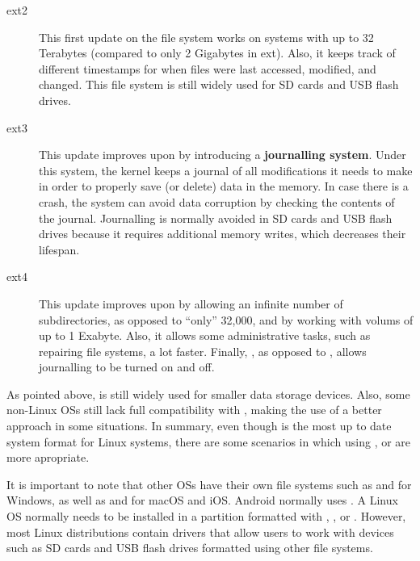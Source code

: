 \begin{description}
\item[ext2] This first update on the  file system works on systems with up to 32 Terabytes (compared to only 2 Gigabytes in ext). Also, it keeps track of different timestamps for when files were last accessed, modified, and changed. This file system is still widely used for SD cards and USB flash drives.
\item[ext3] This update improves upon  by introducing a \textbf{journalling system}. Under this system, the kernel keeps a journal of all modifications it needs to make in order to properly save (or delete) data in the memory. In case there is a crash, the system can avoid data corruption by checking the contents of the journal. Journalling is normally avoided in SD cards and USB flash drives because it requires additional memory writes, which decreases their lifespan.
\item[ext4] This update improves upon  by allowing an infinite number of subdirectories, as opposed to ``only'' 32,000, and by working with volums of up to 1 Exabyte. Also, it allows some administrative tasks, such as repairing file systems, a lot faster. Finally, , as opposed to ,  allows journalling to be turned on and off.
\end{description}

As pointed above,  is still widely used for smaller data storage devices. Also, some non-Linux \acs{OS}s still lack full compatibility with , making the use of  a better approach in some situations. In summary, even though  is the most up to date system format for Linux systems, there are some scenarios in which using , or  are more apropriate.

It is important to note that other \acs{OS}s have their own file systems such as  and  for Windows, as well as  and  for macOS and iOS. Android normally uses . A Linux \acs{OS} normally needs to be installed in a partition formatted with , , or . However, most Linux distributions contain drivers that allow users to work with devices such as SD cards and USB flash drives formatted using other file systems.

